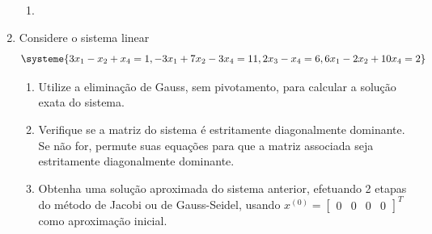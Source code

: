 \documentclass[12pt,a4paper]{article}
\begin{document}
\begin{enumerate}
\begin{multicols}{2}
\begin{enumerate}
\item {}
\end{enumerate}
\end{multicols}
\item Considere o sistema linear
\[
\systeme{
 3x_1 - x_2       + x_4 = 1,
-3x_1 +7x_2       -3x_4 = 11,
            2 x_3 - x_4 = 6,
 6x_1 -2x_2      +10x_4 = 2
}
\]
\begin{enumerate}
\item Utilize a eliminação de Gauss, sem pivotamento, para calcular a solução exata do sistema.
\item Verifique se a matriz do sistema é estritamente diagonalmente dominante. Se não for, permute suas equações para que a matriz associada seja estritamente diagonalmente dominante.
\item Obtenha uma solução aproximada do sistema anterior, efetuando 2 etapas do método de Jacobi ou de Gauss-Seidel, usando $x^{(0)} = \begin{bmatrix}
0 & 0 & 0 & 0
\end{bmatrix}^T$ como aproximação inicial.
\end{enumerate}


\end{enumerate}
\end{document}
